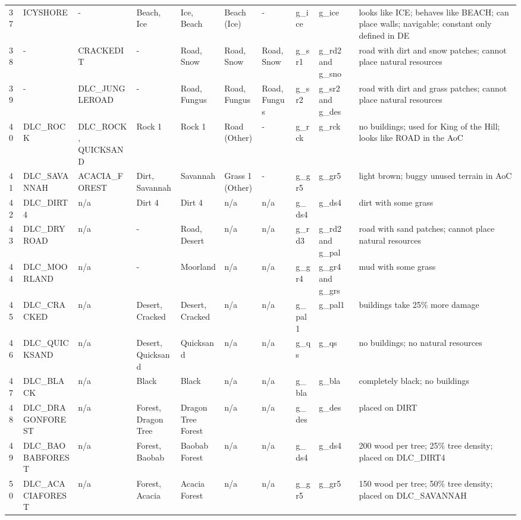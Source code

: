 \begin{landscape}
\begin{longtable}{@{}p{5mm}|p{25mm}p{23mm}|p{14mm}p{14mm}p{14mm}p{14mm}|p{10mm}p{15mm}|p{45mm}@{}}
            37	&  ICYSHORE	& -	& Beach, Ice	& Ice, Beach	& Beach (Ice)	& -	& g\_ice	& g\_ice		& looks like ICE; behaves like BEACH; can place walls; navigable; constant only defined in DE \\
            38	& -	& CRACKEDIT	& -	& Road, Snow	& Road, Snow	& Road, Snow	& g\_sr1	& g\_rd2 and g\_sno		& road with dirt and snow patches; cannot place natural resources \\
            39	& -	& DLC\_JUNGLEROAD	& -	& Road, Fungus	& Road, Fungus	& Road, Fungus	& g\_sr2	& g\_sr2 and g\_des		& road with dirt and grass patches; cannot place natural resources \\
            40	& DLC\_ROCK	& DLC\_ROCK, QUICKSAND	& Rock 1	& Rock 1	& Road (Other)	& -	& g\_rck	& g\_rck		& no buildings; used for King of the Hill; looks like ROAD in the AoC \\
            41	& DLC\_SAVANNAH	& ACACIA\_FOREST	& Dirt, Savannah	& Savannah	& Grass 1 (Other)	& -	& g\_gr5	& g\_gr5		& light brown; buggy unused terrain in AoC  \\
            42	& DLC\_DIRT4	& n/a	& Dirt 4	& Dirt 4	& n/a	& n/a	& g\_ds4	& g\_ds4		& dirt with some grass \\
            43	& DLC\_DRYROAD	& n/a	& -	& Road, Desert	& n/a	& n/a	& g\_rd3	& g\_rd2 and g\_pal		& road with sand patches; cannot place natural resources \\
            44	& DLC\_MOORLAND	& n/a	& -	& Moorland	& n/a	& n/a	& g\_gr4	& g\_gr4 and g\_grs		& mud with some grass \\
            45	& DLC\_CRACKED	& n/a	& Desert, Cracked	& Desert, Cracked	& n/a	& n/a	& g\_pal1	& g\_pal1		& buildings take 25\% more damage \\
            46	& DLC\_QUICKSAND	& n/a	& Desert, Quicksand	& Quicksand	& n/a	& n/a	& g\_qs	& g\_qs		& no buildings; no natural resources \\
            47	& DLC\_BLACK	& n/a	& Black	& Black	& n/a	& n/a	& g\_bla	& g\_bla		& completely black; no buildings \\
            48	& DLC\_DRAGONFOREST	& n/a	& Forest, Dragon Tree	& Dragon Tree Forest	& n/a	& n/a	& g\_des	& g\_des		& placed on DIRT \\
            49	& DLC\_BAOBABFOREST	& n/a	& Forest, Baobab	& Baobab Forest	& n/a	& n/a	& g\_ds4	& g\_ds4		& 200 wood per tree; 25\% tree density; placed on DLC\_DIRT4 \\
            50	& DLC\_ACACIAFOREST	& n/a	& Forest, Acacia	& Acacia Forest	& n/a	& n/a	& g\_gr5	& g\_gr5		& 150 wood per tree; 50\% tree density; placed on DLC\_SAVANNAH \\

\end{longtable}
\end{landscape}

